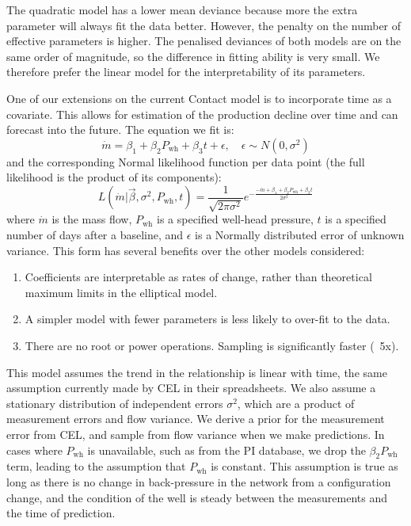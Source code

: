 \documentclass[a4paper, 12pt]{article}
\newlength{\drop}
\begin{document}
The quadratic model has a lower mean deviance because more the extra parameter will always fit the data better. However, the penalty on the number of effective parameters is higher. The penalised deviances of both models are on the same order of magnitude, so the difference in fitting ability is very small. We therefore prefer the linear model for the interpretability of its parameters.

One of our extensions on the current Contact model is to incorporate time as a covariate. This allows for estimation of the production decline over time and can forecast into the future. The equation we fit is:
\begin{equation} \label{eq:linreg}
\dot{m} = \beta_1 + \beta_2P_\text{wh} + \beta_3t + \epsilon,\quad \epsilon\sim N(0, \sigma^2)
\end{equation}
and the corresponding Normal likelihood function per data point (the full likelihood is the product of its components):
\begin{equation}
L\left( \dot{m} | \vec{\beta},\sigma^2,P_\text{wh},t \right) = \frac{1}{\sqrt{2\pi\sigma^2}} e^{-\frac{-\dot{m} + \beta_1 + \beta_2P_\text{wh} + \beta_3t}{2\sigma^2}}
\end{equation}
where $\dot{m}$ is the mass flow, $P_\text{wh}$ is a specified well-head pressure, $t$ is a specified number of days after a baseline, and $\epsilon$ is a Normally distributed error of unknown variance. This form has several benefits over the other models considered:

\begin{enumerate}
\item Coefficients are interpretable as rates of change, rather than theoretical maximum limits in the elliptical model.
\item A simpler model with fewer parameters is less likely to over-fit to the data.
\item There are no root or power operations. Sampling is significantly faster (~5x).
\end{enumerate}

This model assumes the trend in the relationship is linear with time, the same assumption currently made by CEL in their spreadsheets. We also assume a stationary distribution of independent errors $\sigma^2$, which are a product of measurement errors and flow variance. We derive a prior for the measurement error from CEL, and sample from flow variance when we make predictions. In cases where $P_\text{wh}$ is unavailable, such as from the PI database, we drop the $\beta_2P_\text{wh}$ term, leading to the assumption that $P_\text{wh}$ is constant. This assumption is true as long as there is no change in back-pressure in the network from a configuration change, and the condition of the well is steady between the measurements and the time of prediction.
\end{document}
